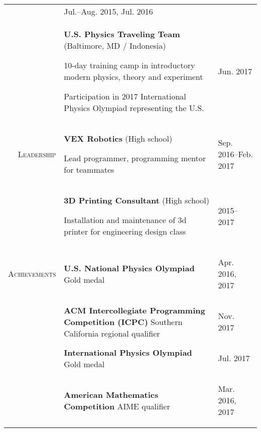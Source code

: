 \documentclass[8pt]{extarticle}
\makeatletter
\newcommand{\compress}{\@minipagetrue}
\newcommand{\location}[1]{(#1)}
\newcommand{\name}[1]{\textbf{#1}\hspace{1em}}
\makeatother
\begin{document}
\begin{center}
\begin{tabularx}{\textwidth}{>{\scshape}r >{\compress}X | >{\footnotesize\scshape}l}
&

Jul.--Aug. 2015, Jul. 2016

\\

&

\name{U.S. Physics Traveling Team} \location{Baltimore, MD / Indonesia}

10-day training camp in introductory modern physics, theory and experiment

Participation in 2017 International Physics Olympiad representing the U.S.

&

Jun. 2017



\\

Leadership

&

\name{VEX Robotics} \location{High school}

Lead programmer, programming mentor for teammates

&

Sep. 2016--Feb. 2017

\\

&

\name{3D Printing Consultant} \location{High school}

Installation and maintenance of 3d printer for engineering design class

&

2015--2017

\\

Achievements

&

\name{U.S. National Physics Olympiad}  Gold medal

&

Apr. 2016, 2017

\\

&

\name{ACM Intercollegiate Programming Competition (ICPC)} Southern California regional qualifier

&

Nov. 2017

\\

&

\name{International Physics Olympiad} Gold medal

&

Jul. 2017

\\

&

\name{American Mathematics Competition} AIME qualifier

&

Mar. 2016, 2017






\end{tabularx}
\end{center}
\end{document}

